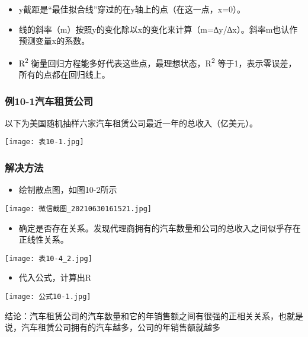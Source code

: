 \begin{itemize}
\tightlist
\item
  y截距是``最佳拟合线''穿过的在y轴上的点（在这一点，x=0）。
\item
  线的斜率（m）按照y的变化除以x的变化来计算（m=∆y/∆x）。斜率m也认作预测变量x的系数。
\item
  R\textsuperscript{2}
  衡量回归方程能多好代表这些点，最理想状态，R\textsuperscript{2}
  等于1，表示零误差，所有的点都在回归线上。
\end{itemize}

\hypertarget{ux4f8b10-1ux6c7dux8f66ux79dfux8d41ux516cux53f8}{%
\subsubsection{例10-1汽车租赁公司}\label{ux4f8b10-1ux6c7dux8f66ux79dfux8d41ux516cux53f8}}

以下为美国随机抽样六家汽车租赁公司最近一年的总收入（亿美元）。


\texttt{[image: 表10-1.jpg]}

\hypertarget{ux89e3ux51b3ux65b9ux6cd5}{%
\subsubsection{解决方法}\label{ux89e3ux51b3ux65b9ux6cd5}}

\begin{itemize}
\tightlist
\item
  绘制散点图，如图10-2所示
\end{itemize}

\texttt{[image: 微信截图\_20210630161521.jpg]}

\begin{itemize}
\tightlist
\item
  确定是否存在关系。发现代理商拥有的汽车数量和公司的总收入之间似乎存在正线性关系。
\end{itemize}


\texttt{[image: 表10-4\_2.jpg]}

\begin{itemize}
\tightlist
\item
  代入公式，计算出R
\end{itemize}


\texttt{[image: 公式10-1.jpg]}

结论：汽车租赁公司的汽车数量和它的年销售额之间有很强的正相关关系，也就是说，汽车租赁公司拥有的汽车越多，公司的年销售额就越多

